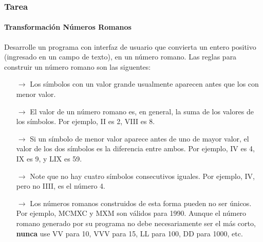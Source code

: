 \documentclass{beamer}
\begin{document}
    \begin{frame}
		\frametitle{Tarea}
        \framesubtitle{Transformaci\'on N\'umeros Romanos}
        {\scriptsize
        Desarrolle un programa con interfaz de usuario que convierta un entero positivo (ingresado en un campo de texto), en un n\'umero romano. Las reglas para construir un n\'umero romano son las siguentes:
        
		\begin{itemize}
			\item[$\rightarrow$] Los s\'imbolos con un valor grande usualmente aparecen antes que los con menor valor.
			\item[$\rightarrow$] El valor de un n\'umero romano es, en general, la suma de los valores de los s\'imbolos. Por ejemplo, II es 2, VIII es 8. 
			\item[$\rightarrow$] Si un s\'imbolo de menor valor aparece antes de uno de mayor valor, el valor de los dos s\'imbolos es la diferencia entre ambos. Por ejemplo, IV es 4, IX es 9, y LIX es 59.
			\item[$\rightarrow$] Note que no hay cuatro s\'imbolos consecutivos iguales. Por ejemplo, IV, pero no IIII, es el n\'umero 4.
			\item[$\rightarrow$] Los n\'umeros romanos construidos de esta forma pueden no ser \'unicos. Por ejemplo, MCMXC y MXM son v\'alidos para 1990. Aunque el n\'umero romano generado por su programa no debe necesariamente ser el m\'as corto, \textbf{nunca} use VV para 10, VVV para 15, LL para 100, DD para 1000, etc.
		\end{itemize}}
	\end{frame}	
	
	
\end{document}
